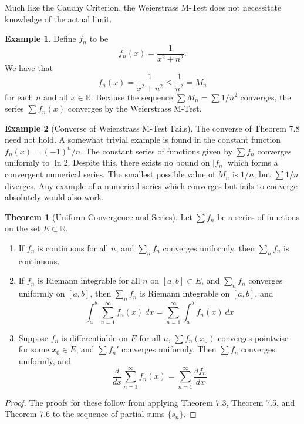\documentclass{article}
\newcommand{\R}{\mathbb{R}}
\theoremstyle{definition}
\newtheorem{theorem}{Theorem}[section]
\newtheorem{example}{Example}[section]
\begin{document}
	Much like the Cauchy Criterion, the Weierstrass M-Test does not necessitate knowledge of the actual limit. 
	\begin{example}
		Define $ f_n $ to be $$ f_n(x)=\frac{1}{x^2+n^2}.$$ We have that $$  f_n(x)=\frac{1}{x^2+n^2}\le \frac{1}{n^2}=M_n$$ for each $ n $ and all $ x\in\R $. Because the sequence $ \sum M_n=\sum 1/n^2 $ converges, the series $ \sum f_n(x) $ converges by the Weierstrass M-Test. 
	\end{example}
	
	\begin{example}[Converse of Weierstrass M-Test Fails]
		The converse of Theorem 7.8 need not hold. A somewhat trivial example is found in the constant function $ f_n(x)=(-1)^n/n $. The constant series of functions given by $ \sum f_n  $ converges uniformly to $ \ln 2 $. Despite this, there exists no bound on $ |f_n| $ which forms a convergent numerical series. The smallest possible value of $ M_n $ is $ 1/n $, but $ \sum 1/n $ diverges. Any example of a numerical series which converges but fails to converge absolutely would also work.
	\end{example}
	
	\begin{theorem}[Uniform Convergence and Series]
		Let $ \sum f_n $ be a series of functions on the set $ E\subset \R $.
		\begin{enumerate}
			\item If $ f_n $ is continuous for all $ n $, and $ \sum_n f_n $ converges uniformly, then $  \sum_n f_n $ is continuous. 
			\item If $ f_n $ is Riemann integrable for all $ n $ on $ [a,b]\subset E $, and $ \sum_n f_n $ converges uniformly on $ [a,b] $, then $  \sum_n f_n $ is Riemann integrable on $ [a,b] $, and $$ \int_{a}^{b}\sum_{n=1}^{\infty}f_n(x)\ dx=\sum_{n=1}^{\infty}\int_{a}^{b}f_n(x)\ dx $$ 
			\item Suppose $ f_n $ is differentiable on $ E $ for all $ n $, $ \sum f_n(x_0) $ converges pointwise for some $ x_0\in E $, and $ \sum f_n' $ converges uniformly. Then $ \sum f_n $ converges uniformly, and $$\frac{d}{dx}\sum_{n=1}^{\infty}f_n(x)=\sum_{n=1}^{\infty}\frac{df_n}{dx} $$
		\end{enumerate}
	\end{theorem}
	\begin{proof}
		The proofs for these follow from applying Theorem 7.3, Theorem 7.5, and Theorem 7.6 to the sequence of partial sums $ \{s_n\} $.
	\end{proof}
	
\end{document}
